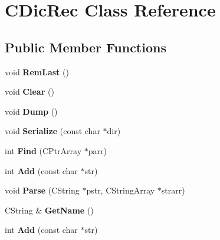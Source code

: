 \hypertarget{class_c_dic_rec}{\section{C\-Dic\-Rec Class Reference}
\label{class_c_dic_rec}
}
\subsection*{Public Member Functions}
\begin{DoxyCompactItemize}
\item 
\hypertarget{class_c_dic_rec_ac0e4b4fd220a16ebecc22a64fbf7aac0}{void {\bfseries Rem\-Last} ()}\label{class_c_dic_rec_ac0e4b4fd220a16ebecc22a64fbf7aac0}

\item 
\hypertarget{class_c_dic_rec_af6013ee07977f88ea7198caa21fe078a}{void {\bfseries Clear} ()}\label{class_c_dic_rec_af6013ee07977f88ea7198caa21fe078a}

\item 
\hypertarget{class_c_dic_rec_a3dae3ce1f0e875ec8da44f5495b56c0e}{void {\bfseries Dump} ()}\label{class_c_dic_rec_a3dae3ce1f0e875ec8da44f5495b56c0e}

\item 
\hypertarget{class_c_dic_rec_a2e98f051b1768b05286ad95016188243}{void {\bfseries Serialize} (const char $\ast$dir)}\label{class_c_dic_rec_a2e98f051b1768b05286ad95016188243}

\item 
\hypertarget{class_c_dic_rec_a98fd8c1ad9af85bea8c190b7c3c82d57}{int {\bfseries Find} (C\-Ptr\-Array $\ast$parr)}\label{class_c_dic_rec_a98fd8c1ad9af85bea8c190b7c3c82d57}

\item 
\hypertarget{class_c_dic_rec_a56d14b8bf298781f7367c955c7024f45}{int {\bfseries Add} (const char $\ast$str)}\label{class_c_dic_rec_a56d14b8bf298781f7367c955c7024f45}

\item 
\hypertarget{class_c_dic_rec_aed325202bdc1be0c5a836fc93d98e618}{void {\bfseries Parse} (C\-String $\ast$pstr, C\-String\-Array $\ast$strarr)}\label{class_c_dic_rec_aed325202bdc1be0c5a836fc93d98e618}

\item 
\hypertarget{class_c_dic_rec_a80af1bb2ad8a91131f7017619b85d47f}{C\-String \& {\bfseries Get\-Name} ()}\label{class_c_dic_rec_a80af1bb2ad8a91131f7017619b85d47f}

\item 
\hypertarget{class_c_dic_rec_a56d14b8bf298781f7367c955c7024f45}{int {\bfseries Add} (const char $\ast$str)}\label{class_c_dic_rec_a56d14b8bf298781f7367c955c7024f45}


\end{DoxyCompactItemize}
